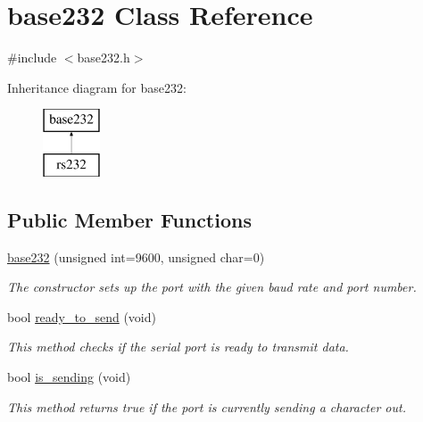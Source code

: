 \hypertarget{classbase232}{\section{base232 Class Reference}
\label{classbase232}
}


{\ttfamily \#include $<$base232.\-h$>$}

Inheritance diagram for base232\-:\begin{figure}[H]
\begin{center}
\leavevmode
\includegraphics[height=2.000000cm]{classbase232}
\end{center}
\end{figure}
\subsection*{Public Member Functions}
\begin{DoxyCompactItemize}
\item 
\hyperlink{classbase232_a3deb8426a4b5dc074dd82d23f5379278}{base232} (unsigned int=9600, unsigned char=0)
\begin{DoxyCompactList}\small\item\em The constructor sets up the port with the given baud rate and port number. \end{DoxyCompactList}\item 
bool \hyperlink{classbase232_a6fc5bf7b7c48a1b520609d6233a187de}{ready\-\_\-to\-\_\-send} (void)
\begin{DoxyCompactList}\small\item\em This method checks if the serial port is ready to transmit data. \end{DoxyCompactList}\item 
bool \hyperlink{classbase232_a1e0a84b93818b0f079866c2ba36bd6bc}{is\-\_\-sending} (void)
\begin{DoxyCompactList}\small\item\em This method returns true if the port is currently sending a character out. \end{DoxyCompactList}\end{DoxyCompactItemize}
